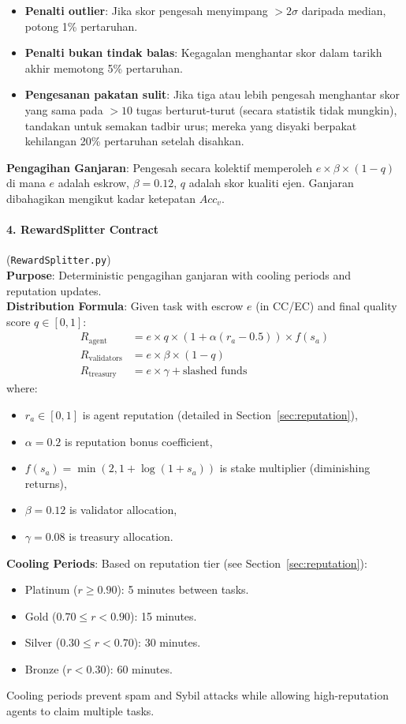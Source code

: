 \documentclass[11pt]{article}
\begin{document}
\begin{itemize}[noitemsep]
  \item \textbf{Penalti outlier}: Jika skor pengesah menyimpang $>2\sigma$ daripada median, potong 1\% pertaruhan.
  \item \textbf{Penalti bukan tindak balas}: Kegagalan menghantar skor dalam tarikh akhir memotong 5\% pertaruhan.
  \item \textbf{Pengesanan pakatan sulit}: Jika tiga atau lebih pengesah menghantar skor yang sama pada $>10$ tugas berturut-turut (secara statistik tidak mungkin), tandakan untuk semakan tadbir urus; mereka yang disyaki berpakat kehilangan 20\% pertaruhan setelah disahkan.
\end{itemize}
\textbf{Pengagihan Ganjaran}: Pengesah secara kolektif memperoleh $e \times \beta \times (1-q)$ di mana $e$ adalah eskrow, $\beta=0.12$, $q$ adalah skor kualiti ejen. Ganjaran dibahagikan mengikut kadar ketepatan $Acc_v$.

\paragraph{4. RewardSplitter Contract} (\texttt{RewardSplitter.py})\\
\textbf{Purpose}: Deterministic pengagihan ganjaran with cooling periods and reputation updates.\\
\textbf{Distribution Formula}: Given task with escrow $e$ (in CC/EC) and final quality score $q \in [0,1]$:
\begin{align}
R_{\text{agent}} &= e \times q \times \left(1 + \alpha (r_a - 0.5)\right) \times f(s_a) \label{eq:reward-agent} \\
R_{\text{validators}} &= e \times \beta \times (1-q) \label{eq:reward-validators} \\
R_{\text{treasury}} &= e \times \gamma + \text{slashed funds} \label{eq:reward-treasury}
\end{align}
where:
\begin{itemize}[noitemsep]
  \item $r_a \in [0,1]$ is agent reputation (detailed in Section~\ref{sec:reputation}),
  \item $\alpha = 0.2$ is reputation bonus coefficient,
  \item $f(s_a) = \min(2, 1 + \log(1+s_a))$ is stake multiplier (diminishing returns),
  \item $\beta = 0.12$ is validator allocation,
  \item $\gamma = 0.08$ is treasury allocation.
\end{itemize}
\textbf{Cooling Periods}: Based on reputation tier (see Section~\ref{sec:reputation}):
\begin{itemize}[noitemsep]
  \item Platinum ($r \geq 0.90$): 5 minutes between tasks.
  \item Gold ($0.70 \leq r < 0.90$): 15 minutes.
  \item Silver ($0.30 \leq r < 0.70$): 30 minutes.
  \item Bronze ($r < 0.30$): 60 minutes.
\end{itemize}
Cooling periods prevent spam and Sybil attacks while allowing high-reputation agents to claim multiple tasks.
\end{document}
